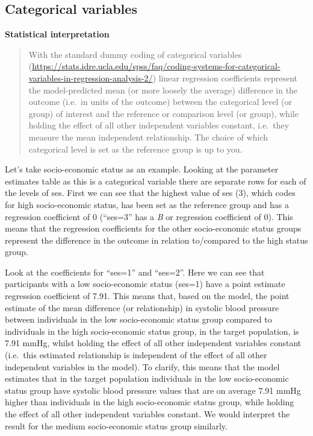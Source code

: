 \documentclass[
]{book}
\begin{document}
\hypertarget{categorical-variables-1}{%
\subsection{Categorical variables}\label{categorical-variables-1}}

\textbf{Statistical interpretation}

\begin{quote}
With the standard dummy coding of categorical variables (\url{https://stats.idre.ucla.edu/spss/faq/coding-systems-for-categorical-variables-in-regression-analysis-2/}) linear regression coefficients represent the model-predicted mean (or more loosely the average) difference in the outcome (i.e.~in units of the outcome) between the categorical level (or group) of interest and the reference or comparison level (or group), while holding the effect of all other independent variables constant, i.e.~they measure the mean independent relationship. The choice of which categorical level is set as the reference group is up to you.
\end{quote}

Let's take socio-economic status as an example. Looking at the parameter estimates table as this is a categorical variable there are separate rows for each of the levels of ses. First we can see that the highest value of ses (3), which codes for high socio-economic status, has been set as the reference group and has a regression coefficient of 0 (``ses=3'' has a \emph{B} or regression coefficient of 0). This means that the regression coefficients for the other socio-economic status groups represent the difference in the outcome in relation to/compared to the high status group.

Look at the coefficients for ``ses=1'' and ``ses=2''. Here we can see that participants with a low socio-economic status (ses=1) have a point estimate regression coefficient of 7.91. This means that, based on the model, the point estimate of the mean difference (or relationship) in systolic blood pressure between individuals in the low socio-economic status group compared to individuals in the high socio-economic status group, in the target population, is 7.91 mmHg, whilst holding the effect of all other independent variables constant (i.e.~this estimated relationship is independent of the effect of all other independent variables in the model). To clarify, this means that the model estimates that in the target population individuals in the low socio-economic status group have systolic blood pressure values that are on average 7.91 mmHg higher than individuals in the high socio-economic status group, while holding the effect of all other independent variables constant. We would interpret the result for the medium socio-economic status group similarly.
\end{document}

